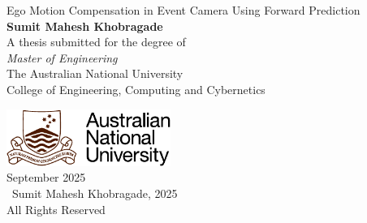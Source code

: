 \documentclass[twoside,onecolumn,12pt,a4paper,openany]{book}
\newcommand{\thesistitle}{Ego Motion Compensation in Event Camera Using Forward Prediction}
\newcommand{\fullname}{Sumit Mahesh Khobragade}
\newcommand{\thesisdate}{September 2025}
\newcommand{\thesisyear}{2025}
\begin{document}

\begin{titlepage}
	\begin{center}
		\vspace*{0cm}
		{\fontsize{20}{10}\selectfont \thesistitle}\\
		\vspace{2.0cm}
		{\bf \huge \fullname}\\
		\vspace{2cm}
		{\large A thesis submitted for the degree of}\\
		\vspace{0.5cm}
		{\it \large Master of Engineering}\\
		\vspace{0.5cm}
		{\large The Australian National University}\\
		\vspace{0.5cm}
		{\large College of Engineering, Computing and Cybernetics} \par
		\vspace{2.0cm}
		\includegraphics[width=0.4\textwidth]{anu-logo-colour.pdf}\\
		\vspace{2.0cm}
		{\large \thesisdate}\\
		\vspace{1.75cm}
		{\large \textcopyright\ \fullname, \thesisyear}\\
		\vspace{0.5cm}
		{\large All Rights Reserved}
	\end{center}
\end{titlepage}


\cleardoublepage
\normalsize

\pagestyle{plain}





\setcounter{tocdepth}{1}
\tableofcontents
{}
\listoffigures
{}
\listoftables
\cleardoublepage

\pagestyle{fancy}
\fancyhead[LO]{\nouppercase{\rightmark}}
\fancyhead[RE]{\nouppercase{\leftmark}}
\fancyhead[LE]{\thepage}
\fancyhead[RO]{\thepage}
\fancyfoot{}
\renewcommand{\headrulewidth}{0.5pt}
\renewcommand{\footrulewidth}{0pt}
\end{document}

